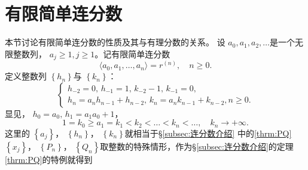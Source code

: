 \section{有限简单连分数}
\setcounter{equation}{0}
\setcounter{theorem}{0}
本节讨论有限简单连分数的性质及其与有理分数的关系。
设 \( a_0, a_1, a_2, \dots \)是一个无限整数列， \( a_j \geqslant 1, j \geqslant 1 \)。记有限简单连分数
\begin{equation}
	\langle a_0, a_1, \dots, a_n \rangle = r^{(n)}, \quad n \geqslant 0. \label{eq:有限简单连分数}
\end{equation}
定义整数列 \( \left\{ h_n\right\} \)与 	\( \left\{k_n\right\} \)：
\begin{equation}\label{eq:hk定义}
	\begin{cases}
		h_{-2} = 0,\, h_{-1} = 1,\, k_{-2} - 1,\, k_{-1} = 0, \\
		h_n = a_nh_{n-1} + h_{n-2},\, k_n = a_nk_{n-1} + k_{n-2}, n \geqslant 0 .
	\end{cases}
\end{equation}
显见， \( h_0 = a_0,\, h_1 = a_1a_0 + 1 \)，
\begin{equation}
	1 = k_0 \geqslant a_1 = k_1 < k_2 < \dots < k_n < \dots, \quad k_n \to + \infty .
\end{equation}
这里的 \( \left\{ a_j \right\} \)， \(\left\{ h_n \right\}\)， \(\left\{ k_n
\right\}\)就相当于\S\ref{subsec:连分数介绍} 中的\eqref{thrm:PQ} \(\left\{ x_j \right\}\)， \(\left\{ P_n \right\}\)，
\(\left\{ Q_n \right\}\)取整数的特殊情形，作为\S\ref{subsec:连分数介绍}的定理\ref{thrm:PQ}的特例就得到
